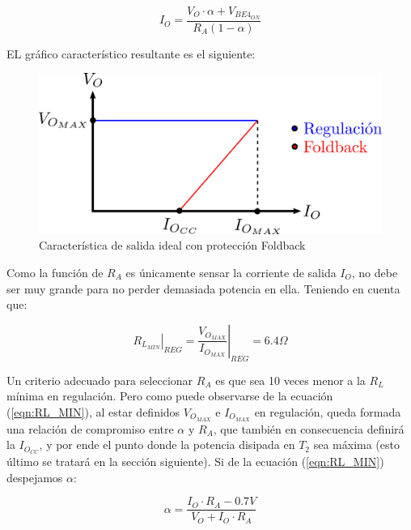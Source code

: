 \begin{equation}
I_O = \frac{V_O \cdot \alpha + V_{BE4_{ON}}}{R_A(1-\alpha)}
\label{eqn:io_fb}
\end{equation}

EL gr\'afico caracter\'istico resultante es el siguiente:

\begin{figure}[!ht]
\begin{centering}
\includegraphics[scale=0.6]{Imagenes/FB_Generico.png}
\par\end{centering}
\caption{Caracter\'istica de salida ideal con protecci\'on Foldback}

\end{figure}

Como la funci\'on de $R_A$ es \'unicamente sensar la corriente de salida $I_O$, no debe ser muy grande para no perder demasiada potencia en ella. Teniendo en cuenta que:

\begin{equation}
\left. R_{L_{MIN}} \right|_{REG} = \left. \frac{V_{O_{MAX}}}{I_{O_{MAX}}} \right|_{REG} = 6.4\Omega
\label{eqn:RL_MIN}
\end{equation}

Un criterio adecuado para seleccionar $R_A$ es que sea 10 veces menor a la $R_L$ m\'inima en regulaci\'on. Pero como puede observarse de la ecuaci\'on (\ref{eqn:RL_MIN}), al estar definidos $V_{O_{MAX}}$ e $I_{O_{MAX}}$ en regulaci\'on, queda formada una relaci\'on de compromiso entre $\alpha$ y $R_A$, que tambi\'en en consecuencia definir\'a la $I_{O_{CC}}$, y por ende el punto donde la potencia disipada en $T_2$ sea m\'axima (esto \'ultimo se tratar\'a en la secci\'on siguiente). Si de la ecuaci\'on (\ref{eqn:RL_MIN}) despejamos $\alpha$:

\begin{equation}
\alpha = \frac{I_O \cdot R_A - 0.7V}{V_O + I_O \cdot R_A}
\label{eqn:alpha}
\end{equation}

